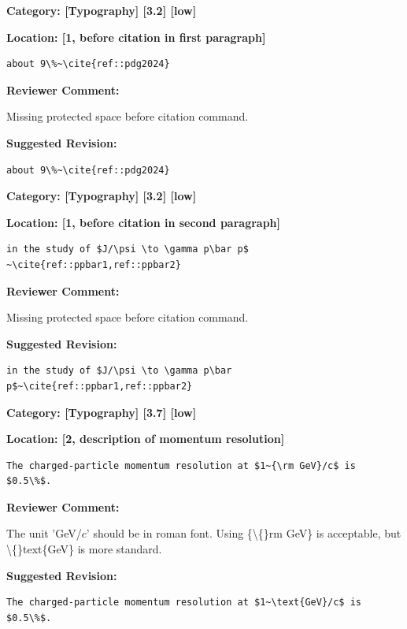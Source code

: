 \documentclass[12pt]{article}
\begin{document}
\begin{reviewer}
\noindent \textbf{Category: [Typography] [3.2] [low]}

\noindent \textbf{Location: [1, before citation in first paragraph]}

\begin{lstlisting}[breaklines=true]
	about 9\%~\cite{ref::pdg2024}
\end{lstlisting}

\textbf{Reviewer Comment:}

Missing protected space before citation command.

\textbf{Suggested Revision:}

\begin{lstlisting}[breaklines=true]
	about 9\%~\cite{ref::pdg2024}
\end{lstlisting}

\end{reviewer}

\begin{reviewer}
\noindent \textbf{Category: [Typography] [3.2] [low]}

\noindent \textbf{Location: [1, before citation in second paragraph]}

\begin{lstlisting}[breaklines=true]
	in the study of $J/\psi \to \gamma p\bar p$ ~\cite{ref::ppbar1,ref::ppbar2}
\end{lstlisting}

\textbf{Reviewer Comment:}

Missing protected space before citation command.

\textbf{Suggested Revision:}

\begin{lstlisting}[breaklines=true]
	in the study of $J/\psi \to \gamma p\bar p$~\cite{ref::ppbar1,ref::ppbar2}
\end{lstlisting}

\end{reviewer}

\begin{reviewer}
\noindent \textbf{Category: [Typography] [3.7] [low]}

\noindent \textbf{Location: [2, description of momentum resolution]}

\begin{lstlisting}[breaklines=true]
	The charged-particle momentum resolution at $1~{\rm GeV}/c$ is $0.5\%$.
\end{lstlisting}

\textbf{Reviewer Comment:}

The unit 'GeV/$c$' should be in roman font. Using \{\textbackslash\{\}rm GeV\} is acceptable, but \textbackslash\{\}text\{GeV\} is more standard.

\textbf{Suggested Revision:}

\begin{lstlisting}[breaklines=true]
	The charged-particle momentum resolution at $1~\text{GeV}/c$ is $0.5\%$.
\end{lstlisting}

\end{reviewer}
\end{document}
